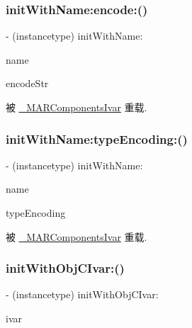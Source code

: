 \subsubsection{\texorpdfstring{init\+With\+Name\+:encode\+:()}{initWithName:encode:()}}
{\footnotesize\ttfamily -\/ (instancetype) init\+With\+Name\+: \begin{DoxyParamCaption}\item[{(N\+S\+String $\ast$)}]{name }\item[{encode:(const char $\ast$)}]{encode\+Str }\end{DoxyParamCaption}}



被 \hyperlink{interface___m_a_r_components_ivar_ac6e9bd2ac3da97f90cd00a54132f182f}{\+\_\+\+M\+A\+R\+Components\+Ivar} 重载.

\mbox{\label{interface_m_a_r_ivar_ad76c8d5f5e52f59678fb7f3d8746fe3c}} 
\subsubsection{\texorpdfstring{init\+With\+Name\+:type\+Encoding\+:()}{initWithName:typeEncoding:()}}
{\footnotesize\ttfamily -\/ (instancetype) init\+With\+Name\+: \begin{DoxyParamCaption}\item[{(N\+S\+String $\ast$)}]{name }\item[{typeEncoding:(N\+S\+String $\ast$)}]{type\+Encoding }\end{DoxyParamCaption}}



被 \hyperlink{interface___m_a_r_components_ivar_a191697e16f4a9d4c2aca202ce702b959}{\+\_\+\+M\+A\+R\+Components\+Ivar} 重载.

\mbox{\label{interface_m_a_r_ivar_ae9ab588059c47c23a19de406155c3e70}} 
\subsubsection{\texorpdfstring{init\+With\+Obj\+C\+Ivar\+:()}{initWithObjCIvar:()}}
{\footnotesize\ttfamily -\/ (instancetype) init\+With\+Obj\+C\+Ivar\+: \begin{DoxyParamCaption}\item[{(Ivar)}]{ivar }\end{DoxyParamCaption}}



